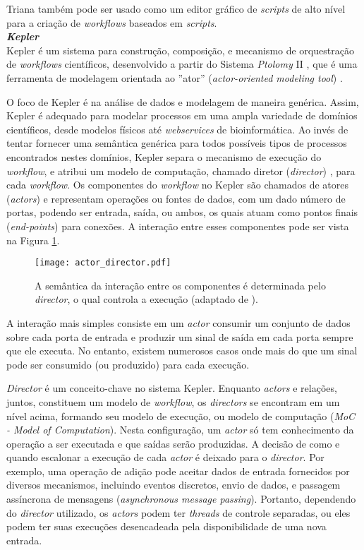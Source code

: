 Triana também pode ser usado como um editor gráfico de \textit{scripts} de alto nível para a criação de \textit{workflows} baseados em \textit{scripts}.\\

\noindent
\textbf{\textit{Kepler}} \\

\noindent
Kepler é um sistema para construção, composição, e mecanismo de orquestração de \textit{workflows} científicos, desenvolvido a partir do Sistema \textit{Ptolomy} II \cite{ptolemy}, que é uma ferramenta de modelagem orientada ao ''ator'' (\textit{actor-oriented modeling tool}) \cite{can_one_size_fit_all}. 

O foco de Kepler é na análise de dados e modelagem de maneira genérica. Assim, Kepler é adequado para modelar processos em uma ampla variedade de domínios científicos, desde modelos físicos até \textit{webservices} de bioinformática. Ao invés de tentar fornecer uma semântica genérica para todos possíveis tipos de processos encontrados nestes domínios, Kepler separa o mecanismo de execução do \textit{workflow}, e atribui um modelo de computação, chamado diretor (\textit{director}) \cite{kepler_system}, para cada \textit{workflow}. Os componentes do \textit{workflow} no Kepler são chamados de atores (\textit{actors}) e representam operações ou fontes de dados, com um dado número de portas, podendo ser entrada, saída, ou ambos, os quais atuam como pontos finais (\textit{end-points}) para conexões. A interação entre esses componentes pode ser vista na Figura \ref{fig:actor_director}.

\begin{figure}[ht]
	\centering
	\texttt{[image: actor\_director.pdf]}
	\caption{A semântica da interação entre os componentes é determinada pelo \textit{director}, o qual controla a execução (adaptado de \cite{kepler_system}).}
	\label{fig:actor_director}
\end{figure}

A interação mais simples consiste em um \textit{actor} consumir um conjunto de dados sobre cada porta de entrada e produzir um sinal de saída em cada porta sempre que ele executa. No entanto, existem numerosos casos onde mais do que um sinal pode ser consumido (ou produzido) para cada execução.

\textit{Director} é um conceito-chave no sistema Kepler. Enquanto \textit{actors} e relações, juntos, constituem um modelo de \textit{workflow}, os \textit{directors} se encontram em um nível acima, formando seu modelo de execução, ou modelo de computação (\textit{MoC - Model of Computation}). Nesta configuração, um \textit{actor} só tem conhecimento da operação a ser executada e que saídas serão produzidas. A decisão de como e quando escalonar a execução de cada \textit{actor} é deixado para o \textit{director}. Por exemplo, uma operação de adição pode aceitar dados de entrada fornecidos por diversos mecanismos, incluindo eventos discretos, envio de dados, e passagem assíncrona de mensagens (\textit{asynchronous message passing}). Portanto, dependendo do \textit{director} utilizado, os \textit{actors} podem ter \textit{threads} de controle separadas, ou eles podem ter suas execuções desencadeada pela disponibilidade de uma nova entrada.

